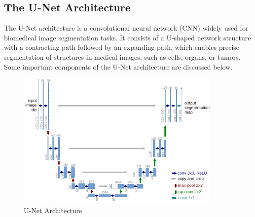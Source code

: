 \subsection{The U-Net Architecture}
The U-Net architecture is a convolutional neural network (CNN) widely used for biomedical image segmentation tasks. It consists of a U-shaped network structure with a contracting path followed by an expanding path, which enables precise segmentation of structures in medical images, such as cells, organs, or tumors. Some important components of the U-Net architecture are discussed below. 
\begin{figure}[ht]
    \centering
    \includegraphics[width=10cm]{images/Theory-DL/UNet.png}
    \caption{U-Net Architecture}
    \label{fig:UNet}
\end{figure}
